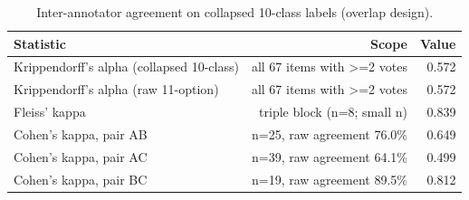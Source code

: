 \begin{table}[t]
\centering
\caption{Inter-annotator agreement on collapsed 10-class labels (overlap design).}
\label{tab:iaa}
\begin{tabular}{lrr}
\toprule
Statistic & Scope & Value \\
\midrule
Krippendorff's alpha (collapsed 10-class) & all 67 items with >=2 votes & 0.572 \\
Krippendorff's alpha (raw 11-option) & all 67 items with >=2 votes & 0.572 \\
Fleiss' kappa & triple block (n=8; small n) & 0.839 \\
Cohen's kappa, pair AB & n=25, raw agreement 76.0\% & 0.649 \\
Cohen's kappa, pair AC & n=39, raw agreement 64.1\% & 0.499 \\
Cohen's kappa, pair BC & n=19, raw agreement 89.5\% & 0.812 \\
\bottomrule
\end{tabular}
\end{table}
